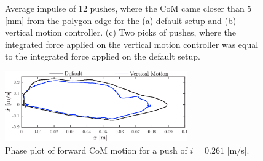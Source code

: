 \begin{figure}
\begin{subfigure}{0.32\textwidth}
  \caption{}
   \label{fig:imp3}
  \end{subfigure}
  \caption{Average impulse of $12$ pushes, where the \ac{CoM} came closer than $5$ [mm] from the polygon edge for the (a) default setup and (b) vertical motion controller. (c) Two picks of pushes, where the integrated force applied on the vertical motion controller was equal to the integrated force applied on the default setup. }
  \label{fig:impulsecompare}
\end{figure}

\begin{figure}[h]
\centering
\includegraphics[width=0.7\textwidth]{STYLESTUFF/valcomparephaseHW.png}
\caption{Phase plot of forward \ac{CoM} motion for a push of $i=0.261$ [m/s].}
\label{fig:valcomparephaseHW}
\end{figure}
